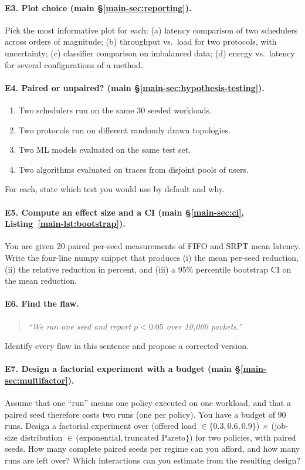 \documentclass[11pt]{article}
\begin{document}
\paragraph{E3. Plot choice (main \S\ref{main-sec:reporting}).} Pick the most informative plot for each:
(a) latency comparison of two schedulers across orders of magnitude;
(b) throughput vs.\ load for two protocols, with uncertainty;
(c) classifier comparison on imbalanced data;
(d) energy vs.\ latency for several configurations of a method.

\paragraph{E4. Paired or unpaired? (main \S\ref{main-sec:hypothesis-testing}).}
\begin{enumerate}[label=(\alph*), leftmargin=*]
    \item Two schedulers run on the same 30 seeded workloads.
    \item Two protocols run on different randomly drawn topologies.
    \item Two ML models evaluated on the same test set.
    \item Two algorithms evaluated on traces from disjoint pools of users.
\end{enumerate}
For each, state which test you would use by default and why.

\paragraph{E5. Compute an effect size and a CI (main \S\ref{main-sec:ci}, Listing~\ref{main-lst:bootstrap}).} You
are given 20 paired per-seed measurements of FIFO and SRPT mean latency.
Write the four-line numpy snippet that produces (i) the mean per-seed
reduction, (ii) the relative reduction in percent, and (iii) a 95\%
percentile bootstrap CI on the mean reduction.

\paragraph{E6. Find the flaw.}
\begin{quote}
\emph{``We ran one seed and report $p < 0.05$ over 10{,}000 packets.''}
\end{quote}
Identify every flaw in this sentence and propose a corrected version.

\paragraph{E7. Design a factorial experiment with a budget (main \S\ref{main-sec:multifactor}).} Assume
that one ``run'' means one policy executed on one workload, and that a
paired seed therefore costs two runs (one per policy). You have a
budget of 90 runs. Design a factorial experiment over (offered load $\in
\{0.3, 0.6, 0.9\}$) $\times$ (job-size distribution $\in \{\text{exponential}, \text{truncated Pareto}\}$)
for two policies, with paired seeds. How many complete paired seeds per
regime can you afford, and how many runs are left over? Which
interactions can you estimate from the resulting design?
\end{document}
